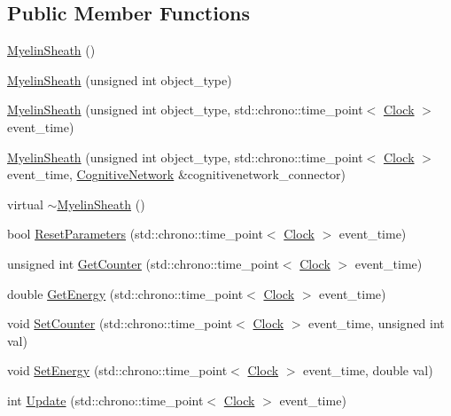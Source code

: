 \subsection*{Public Member Functions}
\begin{DoxyCompactItemize}
\item 
\hyperlink{class_myelin_sheath_a298d69acb8d64de018f32443ea015287}{Myelin\+Sheath} ()
\item 
\hyperlink{class_myelin_sheath_a9f9f90c853f341b5cbf4f2c5035a14af}{Myelin\+Sheath} (unsigned int object\+\_\+type)
\item 
\hyperlink{class_myelin_sheath_a34a80a57ebcde58933a07ca9d99780eb}{Myelin\+Sheath} (unsigned int object\+\_\+type, std\+::chrono\+::time\+\_\+point$<$ \hyperlink{universe_8h_a0ef8d951d1ca5ab3cfaf7ab4c7a6fd80}{Clock} $>$ event\+\_\+time)
\item 
\hyperlink{class_myelin_sheath_aac107d8f22ca3c02f2d346f44950e6d0}{Myelin\+Sheath} (unsigned int object\+\_\+type, std\+::chrono\+::time\+\_\+point$<$ \hyperlink{universe_8h_a0ef8d951d1ca5ab3cfaf7ab4c7a6fd80}{Clock} $>$ event\+\_\+time, \hyperlink{class_cognitive_network}{Cognitive\+Network} \&cognitivenetwork\+\_\+connector)
\item 
virtual \hyperlink{class_myelin_sheath_acf71a2a450e2df353f28eed6c7a4129a}{$\sim$\+Myelin\+Sheath} ()
\item 
bool \hyperlink{class_myelin_sheath_af1174b93be36aa43506a4ba9857d92a4}{Reset\+Parameters} (std\+::chrono\+::time\+\_\+point$<$ \hyperlink{universe_8h_a0ef8d951d1ca5ab3cfaf7ab4c7a6fd80}{Clock} $>$ event\+\_\+time)
\item 
unsigned int \hyperlink{class_myelin_sheath_a10eef8601d129e7e2f28e8ed1ebc975c}{Get\+Counter} (std\+::chrono\+::time\+\_\+point$<$ \hyperlink{universe_8h_a0ef8d951d1ca5ab3cfaf7ab4c7a6fd80}{Clock} $>$ event\+\_\+time)
\item 
double \hyperlink{class_myelin_sheath_ac0c4142b6066e5982c54583e8ac01271}{Get\+Energy} (std\+::chrono\+::time\+\_\+point$<$ \hyperlink{universe_8h_a0ef8d951d1ca5ab3cfaf7ab4c7a6fd80}{Clock} $>$ event\+\_\+time)
\item 
void \hyperlink{class_myelin_sheath_afb9cd377a71881558f48cf8bb226af77}{Set\+Counter} (std\+::chrono\+::time\+\_\+point$<$ \hyperlink{universe_8h_a0ef8d951d1ca5ab3cfaf7ab4c7a6fd80}{Clock} $>$ event\+\_\+time, unsigned int val)
\item 
void \hyperlink{class_myelin_sheath_ad0f6dbae2819f6642a92b8e85ec8f775}{Set\+Energy} (std\+::chrono\+::time\+\_\+point$<$ \hyperlink{universe_8h_a0ef8d951d1ca5ab3cfaf7ab4c7a6fd80}{Clock} $>$ event\+\_\+time, double val)
\item 
int \hyperlink{class_myelin_sheath_af53c8f36ee963168dec09b74a6be8e4c}{Update} (std\+::chrono\+::time\+\_\+point$<$ \hyperlink{universe_8h_a0ef8d951d1ca5ab3cfaf7ab4c7a6fd80}{Clock} $>$ event\+\_\+time)
\end{DoxyCompactItemize}
